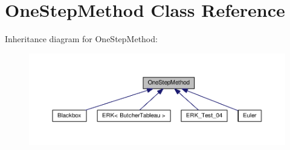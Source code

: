 \hypertarget{classOneStepMethod}{}\section{One\+Step\+Method Class Reference}
\label{classOneStepMethod}


Inheritance diagram for One\+Step\+Method\+:
\nopagebreak
\begin{figure}[H]
\begin{center}
\leavevmode
\includegraphics[width=350pt]{classOneStepMethod__inherit__graph}
\end{center}
\end{figure}
